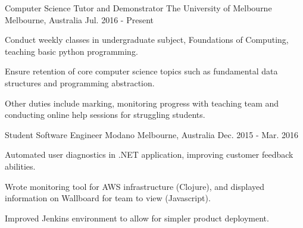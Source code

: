 \begin{cventries}
  \cventry
    {Computer Science Tutor and Demonstrator}
    {The University of Melbourne}
    {Melbourne, Australia}
    {Jul. 2016 - Present}
    {
      \begin{cvitems}
        \item {Conduct weekly classes in undergraduate subject, Foundations of Computing, teaching basic python programming.}
        \item {Ensure retention of core computer science topics such as fundamental data structures and programming abstraction.}
        \item {Other duties include marking, monitoring progress with teaching team and conducting online help sessions for struggling students.}
      \end{cvitems}
    }
  \cventry
    {Student Software Engineer}
    {Modano}
    {Melbourne, Australia}
    {Dec. 2015 - Mar. 2016}
    {
      \begin{cvitems}
        \item{Automated user diagnostics in .NET application, improving customer feedback abilities.}
        \item{Wrote monitoring tool for AWS infrastructure (Clojure), and displayed information on Wallboard for team to view (Javascript).}
        \item{Improved Jenkins environment to allow for simpler product deployment.}
      \end{cvitems}
    }
\end{cventries}
\vspace{-5mm}
